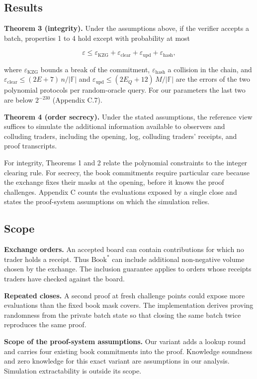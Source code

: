 \subsection{Results}

\textbf{Theorem 3 (integrity).} Under the assumptions above, if the verifier accepts a batch, properties 1 to 4 hold except with probability at most

\[\varepsilon \le \varepsilon_{\mathrm{KZG}} + \varepsilon_{\mathrm{clear}} + \varepsilon_{\mathrm{upd}} + \varepsilon_{\mathrm{hash}},\]

where \(\varepsilon_{\mathrm{KZG}}\) bounds a break of the commitment, \(\varepsilon_{\mathrm{hash}}\) a collision in the chain, and \(\varepsilon_{\mathrm{clear}} \le (2E + 7)\,n/|\mathbb{F}|\) and \(\varepsilon_{\mathrm{upd}} \le (2E_Q + 12)\,M/|\mathbb{F}|\) are the errors of the two polynomial protocols per random-oracle query. For our parameters the last two are below \(2^{-230}\) (Appendix C.7).

\textbf{Theorem 4 (order secrecy).} Under the stated assumptions, the reference view suffices to simulate the additional information available to observers and colluding traders, including the opening, log, colluding traders' receipts, and proof transcripts.

For integrity, Theorems 1 and 2 relate the polynomial constraints to the integer clearing rule. For secrecy, the book commitments require particular care because the exchange fixes their masks at the opening, before it knows the proof challenges. Appendix C counts the evaluations exposed by a single close and states the proof-system assumptions on which the simulation relies.

\subsection{Scope}

\textbf{Exchange orders.} An accepted board can contain contributions for which no trader holds a receipt. Thus \(\text{Book}^*\) can include additional non-negative volume chosen by the exchange. The inclusion guarantee applies to orders whose receipts traders have checked against the board.

\textbf{Repeated closes.} A second proof at fresh challenge points could expose more evaluations than the fixed book mask covers. The implementation derives proving randomness from the private batch state so that closing the same batch twice reproduces the same proof.

\textbf{Scope of the proof-system assumptions.} Our variant adds a lookup round and carries four existing book commitments into the proof. Knowledge soundness and zero knowledge for this exact variant are assumptions in our analysis. Simulation extractability is outside its scope.
